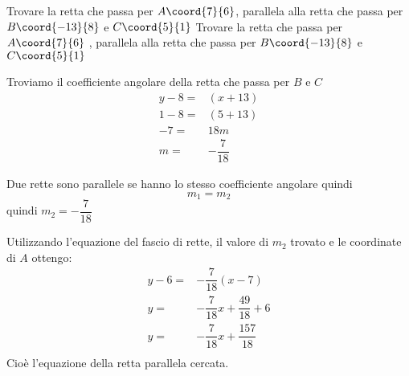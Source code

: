 \begin{exercise}
	Trovare la retta che passa per $A\coord{7}{6}$, parallela alla retta che passa per $B\coord{-13}{8}$ e $C\coord{5}{1}$
	\tcblower
	Trovare la retta che passa per $A\coord{7}{6}$ , parallela alla retta che passa per $B\coord{-13}{8}$ e $C\coord{5}{1}$
	
	Troviamo il coefficiente angolare della retta che passa per $B$ e $C$
	\begin{align*}
		y-8=&(x+13)\\
		1-8=&(5+13)\\
		-7=&18m\\
		m=&-\dfrac{7}{18}
	\end{align*}
	
		Due rette sono parallele se hanno lo stesso coefficiente angolare quindi \[m_1=m_2 \]
		quindi $m_2=-\dfrac{7}{18}$ 
		
		Utilizzando l'equazione del fascio di rette, il valore di $m_2$ trovato e le coordinate di $A$ ottengo:
		\begin{align*}
			y-6=&-\dfrac{7}{18}(x-7)\\
			y=&-\dfrac{7}{18}x+\dfrac{49}{18}+6\\
			y=&-\dfrac{7}{18}x+\dfrac{157}{18}\\
		\end{align*}
		Cioè l'equazione della retta parallela cercata.	
			\begin{center}
				
			\end{center}
\end{exercise}	
